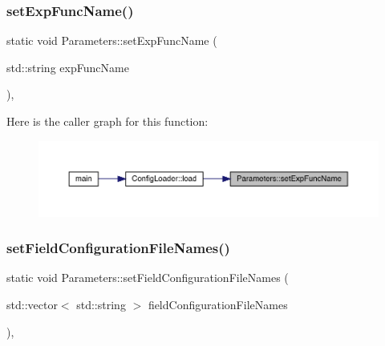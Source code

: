 \subsubsection{\texorpdfstring{setExpFuncName()}{setExpFuncName()}}
{\footnotesize\ttfamily static void Parameters\+::set\+Exp\+Func\+Name (\begin{DoxyParamCaption}\item[{std\+::string}]{exp\+Func\+Name }\end{DoxyParamCaption})\hspace{0.3cm}{\ttfamily [inline]}, {\ttfamily [static]}}

Here is the caller graph for this function\+:
\nopagebreak
\begin{figure}[H]
\begin{center}
\leavevmode
\includegraphics[width=350pt]{class_parameters_abbcb8f09dfec507ec29caa248819522b_icgraph}
\end{center}
\end{figure}
\mbox{\label{class_parameters_a4b1c5312603f90d04f1b6ed732528ae3}} 
\subsubsection{\texorpdfstring{setFieldConfigurationFileNames()}{setFieldConfigurationFileNames()}}
{\footnotesize\ttfamily static void Parameters\+::set\+Field\+Configuration\+File\+Names (\begin{DoxyParamCaption}\item[{std\+::vector$<$ std\+::string $>$}]{field\+Configuration\+File\+Names }\end{DoxyParamCaption})\hspace{0.3cm}{\ttfamily [inline]}, {\ttfamily [static]}}

\mbox{\label{class_parameters_a5afe30ba482014c176433bb183a68976}} 
